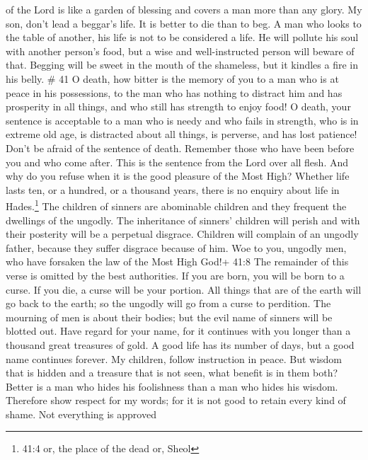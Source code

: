 of the Lord is like a garden of blessing and covers a man more than any
glory.  My son, don't lead a beggar's life. It is better to
die than to beg.  A man who looks to the table of another,
his life is not to be considered a life. He will pollute his soul with
another person's food, but a wise and well-instructed person will beware
of that.  Begging will be sweet in the mouth of the
shameless, but it kindles a fire in his belly. \# 41  O
death, how bitter is the memory of you to a man who is at peace in his
possessions, to the man who has nothing to distract him and has
prosperity in all things, and who still has strength to enjoy food!
 O death, your sentence is acceptable to a man who is needy
and who fails in strength, who is in extreme old age, is distracted
about all things, is perverse, and has lost patience!  Don't
be afraid of the sentence of death. Remember those who have been before
you and who come after. This is the sentence from the Lord over all
flesh.  And why do you refuse when it is the good pleasure
of the Most High? Whether life lasts ten, or a hundred, or a thousand
years, there is no enquiry about life in Hades.\footnote{41:4 or, the
  place of the dead or, Sheol}  The children of sinners are
abominable children and they frequent the dwellings of the ungodly.
 The inheritance of sinners' children will perish and with
their posterity will be a perpetual disgrace.  Children will
complain of an ungodly father, because they suffer disgrace because of
him.  Woe to you, ungodly men, who have forsaken the law of
the Most High God!+ 41:8 The remainder of this verse is omitted by the
best authorities.  If you are born, you will be born to a
curse. If you die, a curse will be your portion.  All
things that are of the earth will go back to the earth; so the ungodly
will go from a curse to perdition.  The mourning of men is
about their bodies; but the evil name of sinners will be blotted out.
 Have regard for your name, for it continues with you
longer than a thousand great treasures of gold.  A good
life has its number of days, but a good name continues forever.
 My children, follow instruction in peace. But wisdom that
is hidden and a treasure that is not seen, what benefit is in them both?
 Better is a man who hides his foolishness than a man who
hides his wisdom.  Therefore show respect for my words; for
it is not good to retain every kind of shame. Not everything is approved
